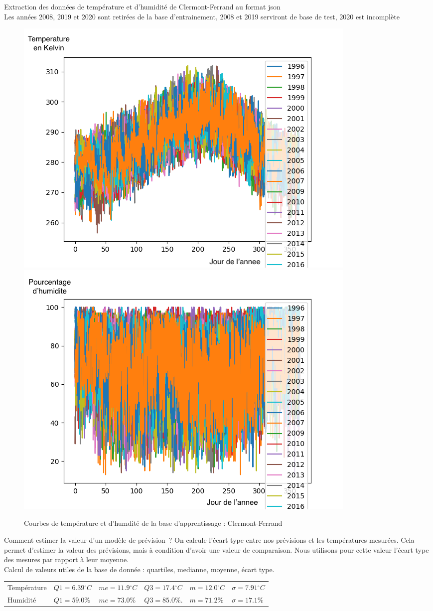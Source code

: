 \documentclass[11pt,a4paper]{article}
\begin{document}
Extraction des données de température et d'humidité de Clermont-Ferrand au format json \\
Les années 2008, 2019 et 2020 sont retirées de la base d'entrainement, 2008 et 2019 serviront de base de test, 2020 est incomplète\\
\begin{figure} [!h]
\centering
\includegraphics[width=0.48 \textwidth]{./imagesTIPE/temperature.png}\quad
\includegraphics[width=0.48 \textwidth]{./imagesTIPE/humidite.png}
\caption{\label{fig:190101Lolita} Courbes de température et d'humdité de la base d'apprentissage : Clermont-Ferrand}
\end{figure}

Comment estimer la valeur d'un modèle de prévision~? On calcule l'écart type entre nos prévisions et les températures mesurées. Cela permet d'estimer la valeur des prévisions, mais à condition d'avoir une valeur de comparaison. Nous utilisons pour cette valeur l'écart type des mesures par rapport à leur moyenne.
 \\ Calcul de valeurs utiles de la base de donnée : quartiles, medianne, moyenne, écart type.\\ 
\begin{tabular}{llllll}\hline\hline
Température& $Q1 = 6.39{}^{\circ}C$ &$ me = 11.9 {}^{\circ}C$ & $Q3 = 17.4{}^{\circ}C $&$ m= 12.0{}^{\circ}C $ & $\sigma = 7.91 {}^{\circ}C$ \\
Humidité    &   $ Q1 = 59.0\%$           &$  me = 73.0\%  $           & $Q3 = 85.0\%.           $& $ m=71.2\%  $ & $\sigma = 17.1 \% $ \\
\hline 
\end{tabular} 
\end{document}
